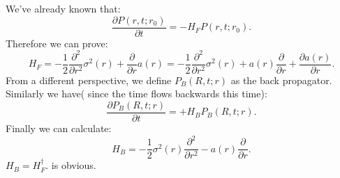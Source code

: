 \documentclass[12pt,a4paper]{paper}
\begin{document}
\indent We've already known that:
\begin{equation}
\frac{\partial P(r,t;r_0)}{\partial t}=-H_{F}P(r,t;r_0).
\end{equation}
Therefore we can prove:
\begin{equation}
H_{F}=-\frac{1}{2}\frac{\partial^2 }{\partial r^2}\sigma ^2(r)+\frac{\partial }{\partial r}a(r)=-\frac{1}{2}\frac{\partial^2 }{\partial r^2}\sigma ^2(r)+a(r)\frac{\partial }{\partial r}+\frac{\partial a(r)}{\partial r}.
\end{equation}
\indent From a different perspective, we define $P_{B}(R,t;r)$ as the back propagator.\\
\indent Similarly we have( since the time flows backwards this time):
\begin{equation}
\frac{\partial P_{B}(R,t;r)}{\partial t}=+H_{B}P_{B}(R,t;r).
\end{equation}
\indent Finally we can calculate:
\begin{equation}
H_{B}=-\frac{1}{2}\sigma ^2(r)\frac{\partial^2 }{\partial r^2}-a(r)\frac{\partial }{\partial r}.
\end{equation}
$H_{B}=H_{F}^{\dag}.$ is obvious.
\end{document}
